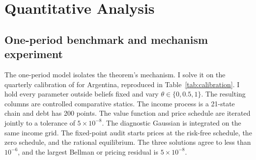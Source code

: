 \documentclass[11pt]{article}
\theoremstyle{definition}
\providecommand{\FPResidual}{$5\times10^{-8}$}
\providecommand{\FPInitDiff}{$10^{-6}$}
\begin{document}
\section{Quantitative Analysis}\label{sec:quant}

\subsection{One-period benchmark and mechanism experiment}

The one-period model isolates the theorem's mechanism. I solve it on the quarterly calibration of \citet{Arellano2008} for Argentina, reproduced in Table~\ref{tab:calibration}. I hold every parameter outside beliefs fixed and vary $\theta\in\{0,0.5,1\}$. The resulting columns are controlled comparative statics. The income process is a 21-state \citet{Tauchen1986} chain and debt has 200 points. The value function and price schedule are iterated jointly to a tolerance of $5\times10^{-8}$. The diagnostic Gaussian is integrated on the same income grid. The fixed-point audit starts prices at the risk-free schedule, the zero schedule, and the rational equilibrium. The three solutions agree to less than \FPInitDiff, and the largest Bellman or pricing residual is \FPResidual.
\end{document}
